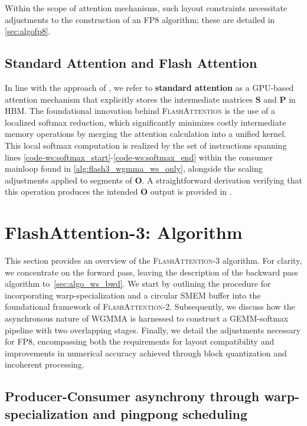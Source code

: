 Within the scope of attention mechanisms, such layout constraints necessitate adjustments to the construction of an FP8 algorithm; these are detailed in \cref{sec:algofp8}.

\subsection{Standard Attention and Flash Attention} In line with the approach of \citet{dao2022flashattention}, we refer to \textbf{standard attention} as a GPU-based attention mechanism that explicitly stores the intermediate matrices $\mathbf{S}$ and $\mathbf{P}$ in HBM. The foundational innovation behind \textsc{FlashAttention} is the use of a localized softmax reduction, which significantly minimizes costly intermediate memory operations by merging the attention calculation into a unified kernel. This local softmax computation is realized by the set of instructions spanning lines \ref{code-ws:softmax_start}-\ref{code-ws:softmax_end} within the consumer mainloop found in \cref{alg:flash3_wgmma_ws_only}, alongside the scaling adjustments applied to segments of $\mathbf{O}$. A straightforward derivation verifying that this operation produces the intended $\mathbf{O}$ output is provided in \cite[\S 2.3.1]{dao2023flashattention2}.

\section{FlashAttention-3: Algorithm}
\label{sec:algo}

This section provides an overview of the \textsc{FlashAttention-3} algorithm. For clarity, we concentrate on the forward pass, leaving the description of the backward pass algorithm to~\cref{sec:algo_ws_bwd}. We start by outlining the procedure for incorporating warp-specialization and a circular SMEM buffer into the foundational framework of \textsc{FlashAttention-2}. Subsequently, we discuss how the asynchronous nature of WGMMA is harnessed to construct a GEMM-softmax pipeline with two overlapping stages. Finally, we detail the adjustments necessary for FP8, encompassing both the requirements for layout compatibility and improvements in numerical accuracy achieved through block quantization and incoherent processing.

\subsection{Producer-Consumer asynchrony through warp-specialization and pingpong scheduling}
\label{sec:algo_ws}

